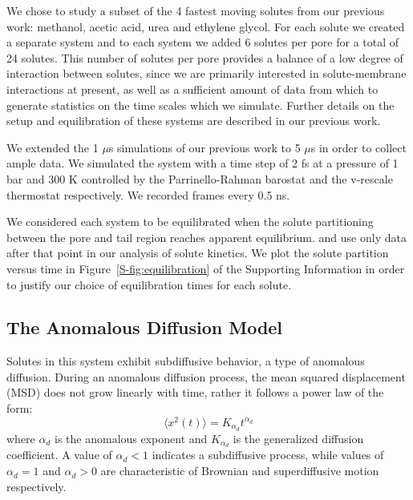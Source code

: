 \documentclass{article}
\begin{document}
  We chose to study a subset of the 4 fastest moving solutes from our previous
  work: methanol, acetic acid, urea and ethylene glycol. For each solute we 
  created a separate system and to each system we added 6 solutes per pore 
  for a total of 24 solutes. This number of solutes per pore provides a balance
  of a low degree of interaction between solutes, since we are primarily interested 
  in solute-membrane interactions at present, as well as a sufficient amount of 
  data from which to generate statistics on the time scales which we simulate.
  Further details on the setup and equilibration of these systems are described in
  our previous work.\cite{coscia_chemically_2019}
  
  We extended the 1 $\mu$s simulations of our previous work to 5 $\mu$s in order
  to collect ample data. We simulated the system with a time step of 2 fs at a pressure
  of 1 bar and 300 K controlled by the Parrinello-Rahman barostat and the v-rescale 
  thermostat respectively. We recorded frames every 0.5 ns.
  
  We considered each system to be equilibrated when the solute partitioning between the 
  pore and tail region %
  reaches apparent equilibrium.
  and use only data after that point in our analysis of solute kinetics.
  We plot the solute partition versus time in Figure~\ref{S-fig:equilibration}
  of the Supporting Information in order to justify our choice of equilibration times
  for each solute.

  \subsection{The Anomalous Diffusion Model}\label{method:model_sFBM}

  Solutes in this system exhibit subdiffusive behavior, a type of anomalous diffusion.
  During an anomalous diffusion process, the mean squared displacement (MSD)
  does not grow linearly with time, rather it follows a power law of the form:
  \begin{equation} 
  \langle x^2(t) \rangle = K_{\alpha_d}t^{\alpha_d}
  \label{eqn:msd_form}
  \end{equation} 
  where $\alpha_d$ is the anomalous exponent and $K_{\alpha_d}$ is the generalized 
  diffusion coefficient. A value of $\alpha_d < 1$ indicates a subdiffusive process, 
  while values of $\alpha_d = 1$ and $\alpha_d > 0$ are characteristic of Brownian and
  superdiffusive motion respectively.
\end{document}
